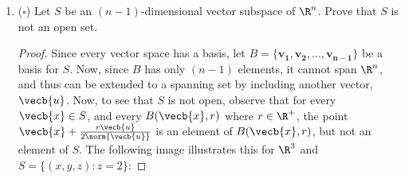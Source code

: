 \documentclass[a5paper]{article}
\theoremstyle{definition}%
\numberwithin{exercise}{section}
\theoremstyle{remark}%
\begin{document}
\begin{enumerate}
\begin{enumerate}[label=(\alph*)]
	\item $\{(x,y,z):x^2+y^2<1\}\subset\R^3$\\
	\textbf{Answer:} Open and not closed. 
	\qedwhite
	\end{enumerate}
	
	\begin{enumerate}
	\setcounter{enumi}{4}	
	\item $\{(x_1, \ldots, x_n): \text{each } x_i\in\Q\}\subset \R^n$\\
	\textbf{Answer:} Not open and not closed. \\
	This set is impossible to draw. I imagine it something like a dense infinite point grid, like a field of stars in space. Each element has infinitely many other elements surrounding it in every direction, as well as elements not in the set surrounding it in a similar way. \qed
	\end{enumerate}


\item ($\square$) Let $S$ be an $(n-1)$-dimensional vector subspace of $\R^n$. Prove that $S$ is not an open set. 
\begin{proof}
Since every vector space has a basis, let $B=\{\mathbf{v_1}, \mathbf{v_2}, \ldots, \mathbf{v_{n-1}}\}$ be a basis for $S$. Now, since $B$ has only $(n-1)$ elements, it cannot span $\R^n$, and thus can be extended to a spanning set by including another vector, 
$\vecb{u}$. Now, to see that $S$ is not open, observe that for every $\vecb{x}\in S$, and every $B(\vecb{x},r)$ where $r\in\R^+$, the point $\vecb{x}+\frac{r\vecb{u}}{2\norm{\vecb{u}}}$ is an element of $B(\vecb{x},r)$, but not an element of $S$. The following image illustrates this for $\R^3$ and $S=\{(x,y,z):z=2\}$:
\end{proof}


\end{enumerate}
\end{document}
